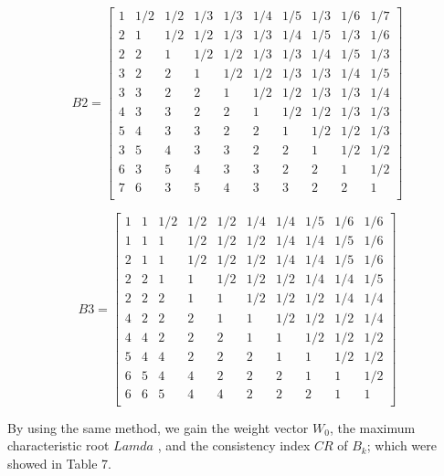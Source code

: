 \documentclass{mcmthesis}
\begin{document}
\begin{equation}
B2={
\left[ \begin{array}{cccccccccc} 
1& 1/2& 1/2& 1/3& 1/3& 1/4& 1/5& 1/3& 1/6& 1/7\\
2& 1& 1/2& 1/2& 1/3& 1/3& 1/4& 1/5& 1/3& 1/6\\
2 & 2 & 1 &1/2 &1/2 &1/3 &1/3 &1/4 &1/5 &1/3\\
3& 2& 2& 1& 1/2& 1/2& 1/3& 1/3& 1/4& 1/5\\
3& 3& 2& 2& 1& 1/2& 1/2& 1/3& 1/3& 1/4\\
4 &3 &3 &2 &2 &1 &1/2 &1/2 &1/3 &1/3\\
5 &4 &3 &3 &2 &2 &1 &1/2 &1/2 &1/3\\
3 &5 &4 &3 &3 &2 &2 &1 &1/2 &1/2\\
6 &3 &5 &4 &3 &3 &2 &2 &1 &1/2\\
7 &6 &3 &5 &4 &3 &3 &2 &2 &1\\




\end{array} 
\right ]}
\end{equation}

\begin{equation}
B3={
\left[ \begin{array}{cccccccccc} 
1& 1& 1/2& 1/2& 1/2& 1/4& 1/4& 1/5& 1/6& 1/6\\
1 &1 &1 &1/2 &1/2 &1/2 &1/4 &1/4 &1/5 &1/6\\
2& 1& 1& 1/2& 1/2& 1/2& 1/4& 1/4 &1/5 &1/6\\
2& 2& 1& 1& 1/2& 1/2& 1/2& 1/4& 1/4& 1/5\\
2& 2& 2& 1& 1& 1/2& 1/2& 1/2& 1/4& 1/4\\
4& 2& 2& 2& 1& 1& 1/2 &1/2& 1/2& 1/4\\
4& 4& 2& 2& 2& 1& 1& 1/2& 1/2& 1/2\\
5& 4& 4& 2& 2& 2& 1& 1& 1/2& 1/2\\
6& 5& 4& 4& 2& 2& 2& 1& 1& 1/2\\
6& 6& 5& 4& 4& 2& 2& 2& 1& 1\\

\end{array} 
\right ]}
\end{equation}

By using the same method, we gain the weight vector $W_0$, the maximum characteristic root $Lamda$ , and the consistency index $CR$ of $B_k$; which were showed in Table 7.\\
\end{document}
